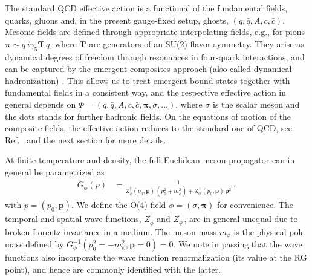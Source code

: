 \documentclass[reprint,english,superscriptaddress,preprintnumbers,amsmath,amssymb,aps,prd,nofootinbib]{revtex4-2}
\newcommand{\bs}[1]{\boldsymbol{#1}}
\begin{document}
The standard QCD effective action is a functional of the fundamental fields, quarks, gluons and, in the present gauge-fixed setup, ghosts, $(q,\bar q,A,c,\bar c)$. Mesonic fields are defined through appropriate interpolating fields, e.g., for pions $\bs{\pi} \sim \bar q\, i \gamma_5 \bs{T}\, q$, where $\bs{T}$ are generators of an SU(2) flavor symmetry. They arise as dynamical degrees of freedom through resonances in four-quark interactions, and can be captured by the emergent composites approach (also called dynamical hadronization) \cite{Gies:2001nw, Gies:2002hq, Pawlowski:2005xe, Floerchinger:2009uf, Fu:2019hdw, Fukushima:2021ctq}. This allows us to treat emergent bound states together with fundamental fields in a consistent way, and the respective effective action in general depends on $\Phi=(q,\bar q,A,c,\bar c, \bs{\pi}, \sigma,\dots)$, where $\sigma$ is the scalar meson and the dots stands for further hadronic fields. On the equations of motion of the composite fields, the effective action reduces to the standard one of QCD, see Ref.\ \cite{Fu:2019hdw} and the next section for more details. 

At finite temperature and density, the full Euclidean meson propagator  can in general be parametrized as  
%
\begin{align}
  G_\phi(p) &=\frac{1}{Z_{\phi}^{\parallel}(p_0, \bs{p})\,\left( p_0^2+m^2_{\phi}\right) +Z_{\phi}^{\perp}(p_0, \bs{p})\,\bs{p}^2 }\,,
  \label{eq:Gam2phiphiB}
\end{align}
%
with $p=(p_0, \boldsymbol{p})$. We define the O(4) field $\phi=(\sigma, \bs{\pi})$ for convenience.
The temporal and spatial wave functions, $Z_{\phi}^{\parallel}$ and $Z_{\phi}^{\perp}$, are in general unequal due to broken Lorentz invariance in a medium. 
The meson mass $m_{\phi}$ is the physical pole mass defined by  $G^{-1}_\phi(p_0^2=-m_\phi^2,\bs{p}=0)=0$. We note in passing that the wave functions also incorporate the wave function renormalization (its value at the RG point), and hence are commonly identified with the latter.
\end{document}
